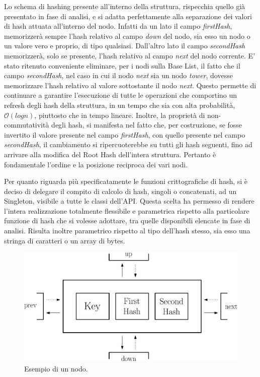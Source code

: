 	Lo schema di hashing presente all'interno della struttura, rispecchia quello già presentato in fase di analisi, e si adatta perfettamente alla separazione dei valori di hash attuata all'interno del nodo. Infatti da un lato il campo \textit{firstHash}, memorizzerà sempre l'hash relativo al campo \textit{down} del nodo, sia esso un nodo o un valore vero e proprio, di tipo qualsiasi. Dall'altro lato il campo \textit{secondHash} memorizzerà, solo se presente, l'hash relativo al campo \textit{next} del nodo corrente. 
	E' stato ritenuto conveniente eliminare, per i nodi sulla Base List, il fatto che il campo \textit{secondHash}, nel caso in cui il nodo \textit{next} sia un nodo \textit{tower}, dovesse memorizzare l'hash relativo al valore sottostante il nodo \textit{next}. Questo permette di continuare a garantire l'esecuzione di tutte le operazioni che comportino un refresh degli hash della struttura, in un tempo che sia con alta probabilità, $\mathcal{O}(log{}n)$, piuttosto che in tempo lineare.
	Inoltre, la proprietà di non-commutatività degli hash, si manifesta nel fatto che, per costruzione, se fosse invertito il valore presente nel campo \textit{firstHash}, con quello presente nel campo \textit{secondHash}, il cambiamento si ripercuoterebbe su tutti gli hash seguenti, fino ad arrivare alla modifica del Root Hash dell'intera struttura. Pertanto è fondamentale l'ordine e la posizione reciproca dei vari nodi.
	
	Per quanto riguarda più specificatamente le funzioni crittografiche di hash, si è deciso di delegare il compito di calcolo di hash, singoli o concatenati, ad un Singleton, visibile a tutte le classi dell'API. Questa scelta ha permesso di rendere l'intera realizzazione totalmente flessibile e parametrica rispetto alla particolare funzione di hash che si volesse adottare, tra quelle disponibili elencate in fase di analisi. Risulta inoltre parametrico rispetto al tipo dell'hash stesso, sia esso una stringa di caratteri o un array di bytes.
	
	\begin{figure}
		\centering
		\includegraphics[scale=0.6]{figure/nodo.eps}
		\caption{Esempio di un nodo.}\label{fig:1}
	\end{figure}
		
